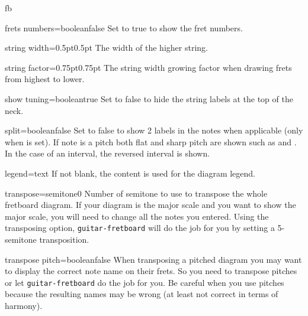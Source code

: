 \documentclass[a4paper]{article}
\newcommand{\pkg}[1]{\texttt{#1}}
\begin{document}
\begin{docEnvironment}{fb}{}
  \begin{docKey}[fb][]{frets numbers}{=boolean}{false}
    Set to true to show the fret numbers.
  \end{docKey}

  \begin{docKey}[fb][]{string width}{=0.5pt}{0.5pt}
    The width of the higher string.
  \end{docKey}

  \begin{docKey}[fb][]{string factor}{=0.75pt}{0.75pt}
    The string width growing factor when drawing frets from highest to
    lower.
  \end{docKey}

  \begin{docKey}[fb][]{show tuning}{=boolean}{true}
    Set to false to hide the string labels at the top of the neck.
  \end{docKey}
  
  \begin{docKey}[fb][]{split}{=boolean}{false}
    Set to false to show 2 labels in the notes when applicable (only when
     is set). If note is a pitch both flat
    and sharp pitch are shown such as \pEb and \pFS. In the case of an
    interval, the reversed interval is shown.
  \end{docKey}
  
  \begin{docKey}[fb][]{legend}{=text}{}
    If not blank, the  content is used for the diagram legend.
  \end{docKey}

  \begin{docKey}[fb][]{transpose}{=semitone}{0}
    Number of semitone to use to transpose the whole fretboard diagram. If
    your diagram is the \pC major scale and you want to show the \pF major
    scale, you will need to change all the notes you entered. Using the
    transposing option, \pkg{guitar-fretboard} will do the job for you by
    setting a 5-semitone transposition.
  \end{docKey}

  \begin{docKey}[fb][]{transpose pitch}{=boolean}{false}
    When transposing a pitched diagram you may want to display the correct
    note name on their frets. So you need to transpose pitches or let
    \pkg{guitar-fretboard} do the job for you. Be careful when you use
    pitches because the resulting names may be wrong (at least not correct
    in terms of harmony).
  \end{docKey}


\end{docEnvironment}
\end{document}
